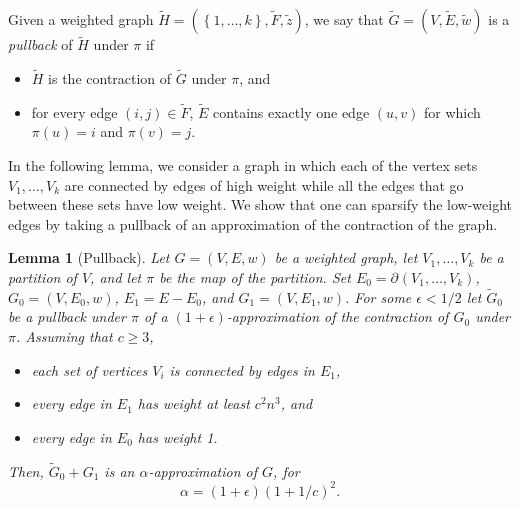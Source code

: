 \documentclass[11pt]{article}
\newtheorem{lemma}[theorem]{Lemma}
\def\Htil{\widetilde{H}}
\def\Gtil{\widetilde{G}}
\def\Etil{\widetilde{E}}
\def\Ftil{\widetilde{F}}
\def\wtil{\tilde{w}}
\def\ztil{\tilde{z}}
\def\bdry#1#2{\partial_{#1}\left(#2\right)}
\def\setof#1{\left\{#1  \right\}}
\def\setof#1{\left\{#1  \right\}}
\begin{document}
Given a weighted graph $\Htil = (\setof{1,\dotsc ,k}, \Ftil , \ztil)$,
  we say that $\Gtil = (V, \Etil , \wtil)$
  is a \textit{pullback} of $\Htil$ under $\pi$ if
\begin{itemize}
\item [1.]  $\Htil$ is the contraction of $\Gtil$ under $\pi$, and
\item [2.]  for every edge
  $(i,j) \in \Ftil$, $\Etil$ contains exactly one edge $(u,v)$
  for which $\pi (u) = i$ and $\pi (v) = j$.
\end{itemize}

In the following lemma, we consider a graph in which each of the vertex
  sets $V_{1},\dotsc , V_{k}$ are connected by edges of high weight while
  all the edges that go between these sets have low weight.
We show that one can sparsify the low-weight edges by taking a pullback
  of an approximation of the contraction of the graph.

\begin{lemma}[Pullback]\label{lem:pullback}
Let $G = (V, E, w)$ be a weighted graph, let $V_{1}, \dotsc , V_{k}$
  be a partition of $V$, and let $\pi$ be the map of the partition.
Set $E_{0} = \bdry{}{V_{1}, \dotsc , V_{k}}$,
  $G_{0} = (V, E_{0}, w)$,
  $E_{1} = E - E_{0}$, and
  $G_{1} = (V, E_{1}, w)$.
For some $\epsilon < 1/2$ let
 $\Gtil_{0} $ be a pullback under $\pi$ of a
  $(1+\epsilon)$-approximation of the contraction of $G_{0}$ under $\pi$.
Assuming that $c \geq 3$,
\begin{itemize}
\item [1.] each set of vertices $V_{i}$ is connected by edges in $E_{1}$,
\item [2.] every edge in $E_{1}$ has weight at least $c^{2} n^{3}$, and
\item [3.] every edge in $E_{0}$ has weight 1.
\end{itemize}
Then, $\Gtil_{0} + G_{1}$ is an $\alpha$-approximation of $G$,
  for
\[
 \alpha  = (1+\epsilon) (1+1/c)^{2}.
\]
\end{lemma}
\end{document}
